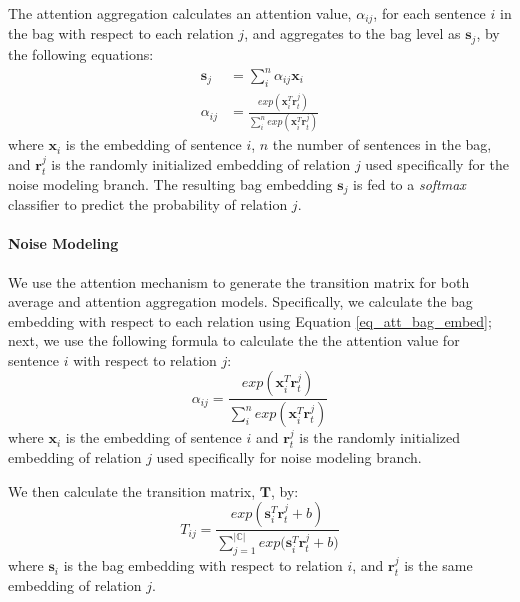 The attention aggregation calculates an attention value, $\alpha_{ij}$, for each sentence $i$ in the bag with respect to each relation $j$, and aggregates to  the bag level as  $\mathbf{s}_j$, by the following equations:
\begin{equation}
\begin{aligned}
\mathbf{s}_j &= \sum_i^{n}{\alpha_{ij} \mathbf{x}_{i}}\\
\alpha_{ij} &= \frac{exp(\mathbf{x}_i^T \mathbf{r}_t^j)}{\sum_i^n{exp(\mathbf{x}_i^T \mathbf{r}_t^j)}}
\end{aligned}
\label{eq_att_bag_embed}
\end{equation}
where $\mathbf{x}_{i}$ is the embedding of sentence $i$, $n$ the number of sentences in the bag, and $\mathbf{r}_t^j$ is the randomly initialized embedding of relation $j$ used specifically for the noise modeling branch.%
The resulting bag embedding $\mathbf{s}_j$ is fed to a \emph{softmax} classifier to predict the probability of relation $j$. 

\paragraph{Noise Modeling}
We use the attention mechanism to generate the transition matrix for both average and attention aggregation models. Specifically, we calculate the bag embedding with respect to each relation using Equation \ref{eq_att_bag_embed}; next, we use the following formula to calculate the the attention value for sentence $i$ with respect to relation $j$:
\begin{equation}
\alpha_{ij} = \frac{exp(\mathbf{x}_i^T \mathbf{r}_t^j)}{\sum_i^n{exp(\mathbf{x}_i^T \mathbf{r}_t^j)}}
\end{equation}
where $\mathbf{x}_i$ is the embedding of sentence $i$ and $\mathbf{r}_t^j$ is the randomly initialized embedding of relation $j$ used specifically for noise modeling branch.


We then calculate the transition matrix, $\mathbf{T}$, by:
\begin{equation}
T_{ij} = \frac{exp({\mathbf{s}_i^T \mathbf{r}_t^j  + b})}{\sum_{j=1}^{|\mathbb{C}|}{exp(\mathbf{s}_i^T \mathbf{r}_t^j + b})}
\end{equation}
where $\mathbf{s}_i$ is the bag embedding with respect to relation $i$, and $\mathbf{r}_t^j$ is the same embedding of relation $j$.


